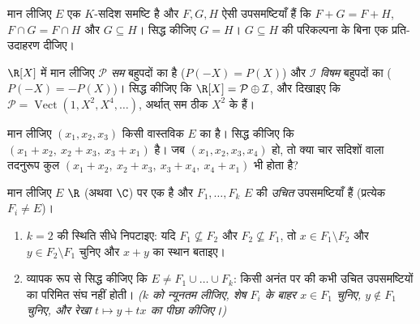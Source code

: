 \begin{exercise}[$\star\star\star$]\label{exo:b1:vspaces:9}
मान लीजिए $E$ एक $K$-सदिश समष्टि है और $F, G, H$ ऐसी उपसमष्टियाँ हैं कि $F +
G = F + H$, $F \cap G = F \cap H$ और $G \subseteq H$। सिद्ध कीजिए $G = H$।
$G \subseteq H$ की परिकल्पना के बिना एक प्रति-उदाहरण दीजिए।
\end{exercise}

\begin{exercise}[$\star\star$]\label{exo:b1:vspaces:10}
$\R[X]$ में मान लीजिए $\mathcal P$ \emph{सम} बहुपदों का  है ($P(-X) =
P(X)$) और $\mathcal I$ \emph{विषम} बहुपदों का ($P(-X) = -P(X)$)। सिद्ध कीजिए
कि $\R[X] = \mathcal P \oplus \mathcal I$, और दिखाइए कि $\mathcal P =
\operatorname{Vect}(1, X^2, X^4, \dots)$, अर्थात् सम  ठीक $X^2$ के
 हैं।
\end{exercise}

\begin{exercise}[$\star\star$]\label{exo:b1:vspaces:11}
मान लीजिए $(x_1, x_2, x_3)$ किसी वास्तविक  $E$ का 
है। सिद्ध कीजिए कि $(x_1 + x_2,\ x_2 + x_3,\ x_3 + x_1)$  है। जब
$(x_1, x_2, x_3, x_4)$  हो, तो क्या चार सदिशों वाला तदनुरूप कुल
$(x_1 + x_2,\ x_2 + x_3,\ x_3 + x_4,\ x_4 + x_1)$ भी  होता है?
\end{exercise}

\begin{exercise}[$\star\star\star$]\label{exo:b1:vspaces:12}
मान लीजिए $E$ $\R$ (अथवा $\C$) पर एक  है और $F_1, \dots, F_k$ $E$
की \emph{उचित} उपसमष्टियाँ हैं (प्रत्येक $F_i \neq E$)।
\begin{enumerate}
  \item $k = 2$ की स्थिति सीधे निपटाइए: यदि $F_1 \not\subseteq F_2$ और $F_2
  \not\subseteq F_1$, तो $x \in F_1 \setminus F_2$ और $y \in F_2 \setminus
  F_1$ चुनिए और $x + y$ का स्थान बताइए।
  \item व्यापक रूप से सिद्ध कीजिए कि $E \neq F_1 \cup \dots \cup F_k$: किसी
  अनंत  पर की  कभी उचित उपसमष्टियों का परिमित संघ नहीं
  होती। \emph{($k$ को न्यूनतम लीजिए, शेष $F_i$ के बाहर $x \in F_1$ चुनिए, $y
  \notin F_1$ चुनिए, और रेखा $t \mapsto y + tx$ का पीछा कीजिए।)}
\end{enumerate}
\end{exercise}

